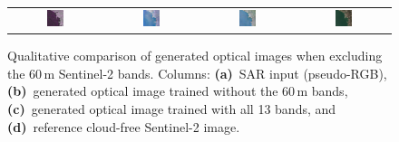 \begin{figure}[!htbp]
\begin{tabular}{cccc}
        \includegraphics[width=0.2\textwidth, height=0.2\textheight, keepaspectratio]{img/exclusion_60_m/bands10/sample_000065_sar_pseudo.png} &
        \includegraphics[width=0.2\textwidth, height=0.2\textheight, keepaspectratio]{img/exclusion_60_m/bands10/sample_000065_pred_rgb.png} &
        \includegraphics[width=0.2\textwidth, height=0.2\textheight, keepaspectratio]{img/exclusion_60_m/bands13/sample_000065_pred_rgb.png} &
        \includegraphics[width=0.2\textwidth, height=0.2\textheight, keepaspectratio]{img/exclusion_60_m/bands10/sample_000065_true_rgb.png} \\
    \end{tabular}

    \caption[Qualitative results when excluding 60\,m bands]{%
    Qualitative comparison of generated optical images when excluding the 60\,m Sentinel-2 bands. 
    Columns: \textbf{(a)}~SAR input (pseudo-RGB), 
    \textbf{(b)}~generated optical image trained without the 60\,m bands, 
    \textbf{(c)}~generated optical image trained with all 13 bands, and 
    \textbf{(d)}~reference cloud-free Sentinel-2 image.}
    \label{fig:ablation_excluding_60m_qualitative}
\end{figure}

